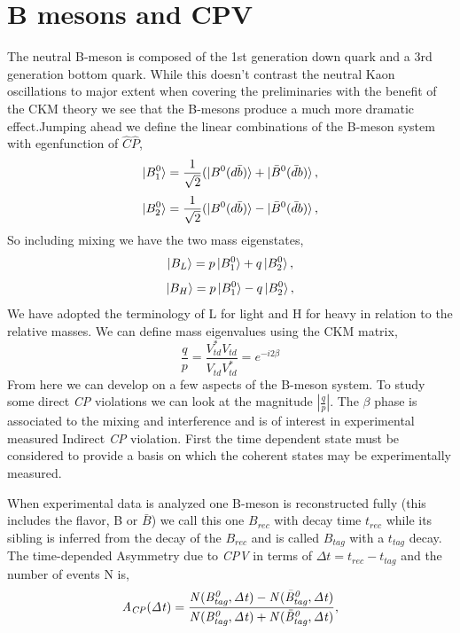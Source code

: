 %

\section*{B mesons and CPV}
The neutral B-meson is composed of the 1st generation down quark and a 3rd generation bottom quark. While this doesn't contrast the neutral Kaon oscillations to major extent when covering the preliminaries with the benefit of the CKM theory we see that the B-mesons produce a much more dramatic effect.Jumping ahead we define the linear combinations of the B-meson system with egenfunction of $\hat{C}\hat{P}$,
\[\ket{B^{0}_{1}}=\frac{1}{\sqrt{2}}(\ket{B^{0}(d\bar{b})}+\ket{\bar{B}^{0}(\bar{d}b)},\]
\[\ket{B^{0}_{2}}=\frac{1}{\sqrt{2}}(\ket{B^{0}(d\bar{b})}-\ket{\bar{B}^{0}(\bar{d}b)},\]
So including mixing we have the two mass eigenstates,
\[\ket{B_{L}}=p\ket{B^{0}_{1}}+q\ket{{B}^{0}_{2}},\]
\[\ket{B_{H}}=p\ket{B^{0}_{1}}-q\ket{{B}^{0}_{2}},\]
We have adopted the terminology of L for light and H for heavy in relation to the relative masses. We can define mass eigenvalues using the CKM matrix,
\[\frac{q}{p}=\frac{V^{*}_{td}V_{td}}{V_{td}V^{*}_{td}}=e^{-i2\beta}\]
From here we can develop on a few aspects of the B-meson system. To study some direct  \textit{CP} violations we can look at the magnitude  $\left| \frac{q}{p} \right|$. The $\beta$ phase is associated to the mixing and interference and is of interest in experimental measured Indirect  \textit{CP} violation. First the time dependent state must be considered to provide a basis on which the coherent states may be experimentally measured. 


When experimental data is analyzed one B-meson is reconstructed fully (this includes the flavor, B or $\bar{B}$) we call this one $B_{rec}$ with decay time $t_{rec}$ while its sibling is inferred from the decay of the $B_{rec}$ and is called $B_{tag}$ with a $t_{tag}$ decay. The time-depended Asymmetry due to \textit{CPV} in terms of $\Delta{t} = t_{rec}-t_{tag}$ and the number of events N is,
\[\it{A}_{CP}(\Delta t)= \frac{N(B^{0}_{tag},\Delta t)-N(\bar{B}^{0}_{tag},\Delta t)}{N(B^{0}_{tag},\Delta t)+N(\bar{B}^{0}_{tag},\Delta t)},\]



